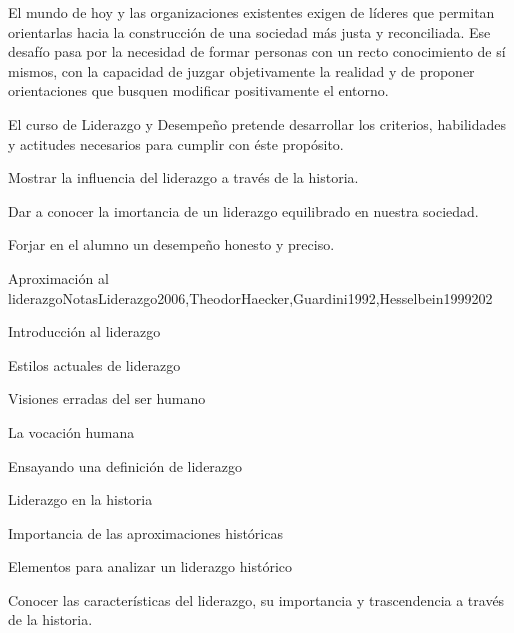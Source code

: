 \begin{syllabus}


\begin{justification}
El mundo de hoy y las organizaciones existentes exigen de líderes que permitan orientarlas hacia la construcción de una sociedad más justa y reconciliada.  Ese desafío pasa por la necesidad de formar personas con un recto conocimiento de sí mismos, con la capacidad de juzgar objetivamente la realidad y de proponer orientaciones que busquen modificar positivamente el entorno.

El curso de Liderazgo y Desempeño pretende desarrollar los criterios, habilidades y actitudes necesarios para cumplir con éste propósito.
\end{justification}

\begin{goals}
\item \OutcomeHU
\item Mostrar la influencia del liderazgo a través de la historia.
\item Dar a conocer la imortancia de un liderazgo equilibrado en nuestra sociedad.
\item Forjar en el alumno un desempeño honesto y preciso.
\end{goals}

\begin{outcomes}
\end{outcomes}

\begin{unit}{Aproximación al liderazgo}{NotasLiderazgo2006,TheodorHaecker,Guardini1992,Hesselbein1999}{20}{2}
\begin{topics}
	\item Introducción al liderazgo
	\item Estilos actuales de liderazgo
	\item Visiones erradas del ser humano
	\item La vocación humana
	\item Ensayando una definición de liderazgo
	\item Liderazgo en la historia
	\item Importancia de las aproximaciones históricas
	\item Elementos para analizar un liderazgo histórico
\end{topics}
\begin{learningoutcomes}
	\item Conocer las características del liderazgo, su importancia y trascendencia a través de la historia.
\end{learningoutcomes}
\end{unit}


\end{syllabus}
